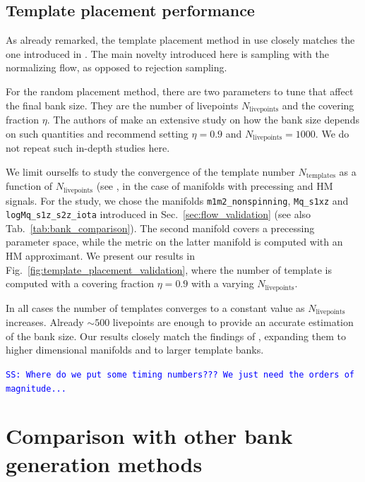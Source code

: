 \documentclass[twocolumn,showpacs,preprintnumbers,nofootinbib,prd,
superscriptaddress,10pt]{revtex4-2}
\newcommand{\stefano}[1]{{\textcolor{blue}{\texttt{SS: #1}} }}
\begin{document}
\subsection{Template placement performance} \label{sec:template_placement}

As already remarked, the template placement method in use closely matches the one introduced in \cite{Coogan:2022qxs}.
The main novelty introduced here is sampling with the normalizing flow, as opposed to rejection sampling.

For the random placement method, there are two parameters to tune that affect the final bank size. They are the number of livepoints $N_\text{livepoints}$ and the covering fraction $\eta$.
The authors of \cite{Coogan:2022qxs} make an extensive study on how the bank size depends on such quantities and recommend setting $\eta = 0.9$ and $N_\text{livepoints} = 1000$. We do not repeat such in-depth studies here.

We limit ourselfs to study the convergence of the template number $N_\text{templates}$ as a function of $N_\text{livepoints}$ (see \cite[Fig.~4 (right)]{Coogan:2022qxs}, in the case of manifolds with precessing and HM signals.
For the study, we chose the manifolds \texttt{m1m2\_nonspinning}, \texttt{Mq\_s1xz} and \texttt{logMq\_s1z\_s2z\_iota} introduced in Sec.~\ref{sec:flow_validation} (see also Tab.~\ref{tab:bank_comparison}). The second manifold covers a precessing parameter space, while the metric on the latter manifold is computed with an HM approximant.
We present our results in Fig.~\ref{fig:template_placement_validation}, where the number of template is computed with a covering fraction $\eta = 0.9$ with a varying $N_\text{livepoints}$.

In all cases the number of templates converges to a constant value as $N_\text{livepoints}$ increases. Already $\sim 500$ livepoints are enough to provide an accurate estimation of the bank size.
Our results closely match the findings of \cite{Coogan:2022qxs}, expanding them to higher dimensional manifolds and to larger template banks.

\stefano{Where do we put some timing numbers??? We just need the orders of magnitude...}

\section{Comparison with other bank generation methods} \label{sec:other_methods}
\end{document}
